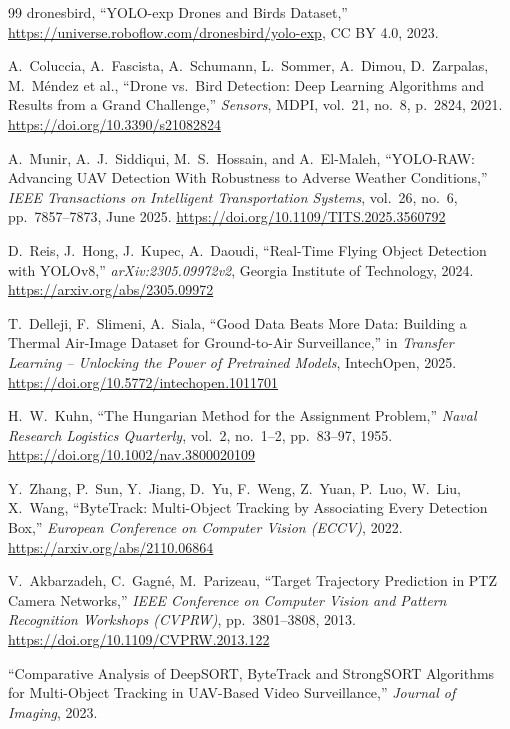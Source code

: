 \documentclass[12pt,a4paper]{report}
\begin{document}
\begin{thebibliography}{99}
dronesbird, ``YOLO-exp Drones and Birds Dataset,''
\url{https://universe.roboflow.com/dronesbird/yolo-exp},
CC BY 4.0, 2023.

A.\ Coluccia, A.\ Fascista, A.\ Schumann, L.\ Sommer, A.\ Dimou,
D.\ Zarpalas, M.\ M\'{e}ndez et al.,
``Drone vs.\ Bird Detection: Deep Learning Algorithms and Results
from a Grand Challenge,''
\textit{Sensors}, MDPI, vol.\ 21, no.\ 8, p.\ 2824, 2021.
\url{https://doi.org/10.3390/s21082824}

A.\ Munir, A.\ J.\ Siddiqui, M.\ S.\ Hossain, and A.\ El-Maleh,
``YOLO-RAW: Advancing UAV Detection With Robustness to Adverse Weather Conditions,''
\textit{IEEE Transactions on Intelligent Transportation Systems},
vol.~26, no.~6, pp.~7857--7873, June 2025.
\url{https://doi.org/10.1109/TITS.2025.3560792}

D.\ Reis, J.\ Hong, J.\ Kupec, A.\ Daoudi,
``Real-Time Flying Object Detection with YOLOv8,''
\textit{arXiv:2305.09972v2}, Georgia Institute of Technology, 2024.
\url{https://arxiv.org/abs/2305.09972}

T.\ Delleji, F.\ Slimeni, A.\ Siala,
``Good Data Beats More Data: Building a Thermal Air-Image Dataset
for Ground-to-Air Surveillance,''
in \textit{Transfer Learning -- Unlocking the Power of Pretrained Models},
IntechOpen, 2025.
\url{https://doi.org/10.5772/intechopen.1011701}

H.\ W.\ Kuhn,
``The Hungarian Method for the Assignment Problem,''
\textit{Naval Research Logistics Quarterly},
vol.~2, no.~1--2, pp.~83--97, 1955.
\url{https://doi.org/10.1002/nav.3800020109}

Y.\ Zhang, P.\ Sun, Y.\ Jiang, D.\ Yu, F.\ Weng, Z.\ Yuan, P.\ Luo, W.\ Liu, X.\ Wang,
``ByteTrack: Multi-Object Tracking by Associating Every Detection Box,''
\textit{European Conference on Computer Vision (ECCV)}, 2022.
\url{https://arxiv.org/abs/2110.06864}

V.\ Akbarzadeh, C.\ Gagn\'{e}, M.\ Parizeau,
``Target Trajectory Prediction in {PTZ} Camera Networks,''
\textit{IEEE Conference on Computer Vision and Pattern Recognition
Workshops (CVPRW)}, pp.\ 3801--3808, 2013.
\url{https://doi.org/10.1109/CVPRW.2013.122}

``Comparative Analysis of DeepSORT, ByteTrack and StrongSORT Algorithms
for Multi-Object Tracking in UAV-Based Video Surveillance,''
\textit{Journal of Imaging}, 2023.


\end{thebibliography}
\end{document}
